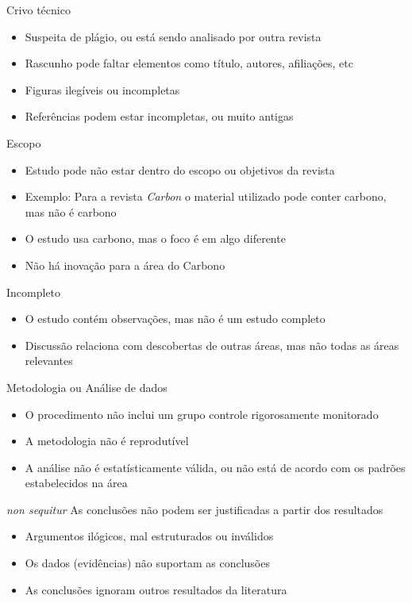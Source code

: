 \documentclass{beamer}
\begin{document}
\begin{frame}{Crivo técnico}
  \begin{itemize}
  \item Suspeita de plágio, ou está sendo analisado por outra revista
  \item Rascunho pode faltar elementos como título, autores,
    afiliações, etc
  \item Figuras ilegíveis ou incompletas
  \item Referências podem estar incompletas, ou muito antigas
  \end{itemize}
\end{frame}

\begin{frame}{Escopo}
  \begin{itemize}
  \item Estudo pode não estar dentro do escopo ou objetivos da revista
  \item Exemplo: Para a revista {\em Carbon} o material utilizado pode
    conter carbono, mas não é carbono
  \item O estudo usa carbono, mas o foco é em algo diferente
  \item Não há inovação para a área do Carbono
  \end{itemize}
\end{frame}

\begin{frame}{Incompleto}
  \begin{itemize}
  \item O estudo contém observações, mas não é um estudo completo
  \item Discussão relaciona com descobertas de outras áreas, mas não
    todas as áreas relevantes
  \end{itemize}
\end{frame}

\begin{frame}{Metodologia ou Análise de dados}
  \begin{itemize}
  \item O procedimento não inclui um grupo controle rigorosamente
    monitorado
  \item A metodologia não é reprodutível
  \item A análise não é estatísticamente válida, ou não está de acordo
    com os padrões estabelecidos na área
  \end{itemize}
\end{frame}

\begin{frame}{{\em non sequitur}}
  As conclusões não podem ser justificadas a partir dos resultados
  \begin{itemize}
  \item Argumentos ilógicos, mal estruturados ou inválidos
  \item Os dados (evidências) não suportam as conclusões
  \item As conclusões ignoram outros resultados da literatura
  \end{itemize}
\end{frame}
\end{document}
